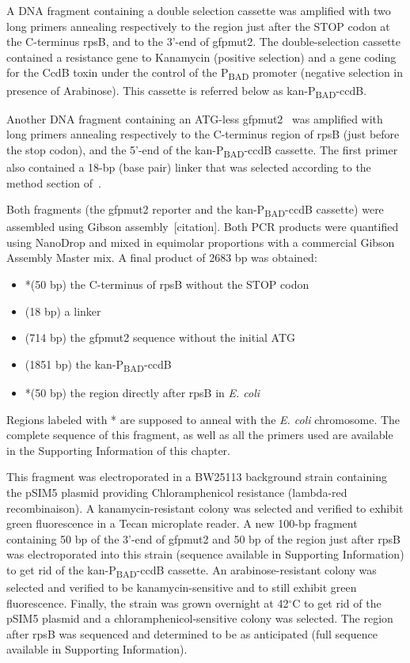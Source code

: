 A DNA fragment containing a double selection cassette was amplified with two long primers annealing respectively to the region just after the STOP codon at the C-terminus rpsB, and to the 3'-end of gfpmut2.
The double-selection cassette contained a resistance gene to Kanamycin (positive selection) and a gene coding for the CcdB toxin under the control of the P\textsubscript{BAD} promoter (negative selection in presence of Arabinose).
This cassette is referred below as kan-P\textsubscript{BAD}-ccdB.

Another DNA fragment containing an ATG-less gfpmut2~\cite{zaslaver_comprehensive_2006} was amplified with long primers annealing respectively to the C-terminus region of rpsB (just before the stop codon), and the 5'-end of the kan-P\textsubscript{BAD}-ccdB cassette.
The first primer also contained a 18-bp (base pair) linker that was selected according to the method section of~\cite{bakshi_superresolution_2012}.

Both fragments (the gfpmut2 reporter and the kan-P\textsubscript{BAD}-ccdB cassette) were assembled using Gibson assembly~[citation].
Both PCR products were quantified using NanoDrop and mixed in equimolar proportions with a commercial Gibson Assembly Master mix.
A final product of 2683 bp was obtained:
\begin{itemize}
\item *(50 bp) the C-terminus of rpsB without the STOP codon 
\item (18 bp) a linker
\item (714 bp) the gfpmut2 sequence without the initial ATG
\item (1851 bp) the kan-P\textsubscript{BAD}-ccdB
\item *(50 bp) the region directly after rpsB in \textit{E. coli}
\end{itemize}
Regions labeled with * are supposed to anneal with the \textit{E. coli} chromosome.
The complete sequence of this fragment, as well as all the primers used are available in the Supporting Information of this chapter.

This fragment was electroporated in a BW25113 background strain containing the pSIM5 plasmid providing Chloramphenicol resistance (lambda-red recombinaison).
A kanamycin-resistant colony was selected and verified to exhibit green fluorescence in a Tecan microplate reader.
A new 100-bp fragment containing 50 bp of the 3'-end of gfpmut2 and 50 bp of the region just after rpsB was electroporated into this strain (sequence available in Supporting Information) to get rid of the kan-P\textsubscript{BAD}-ccdB cassette.
An arabinose-resistant colony was selected and verified to be kanamycin-sensitive and to still exhibit green fluorescence.
Finally, the strain was grown overnight at 42$^\circ$C to get rid of the pSIM5 plasmid and a chloramphenicol-sensitive colony was selected.
The region after rpsB was sequenced and determined to be as anticipated (full sequence available in Supporting Information).

